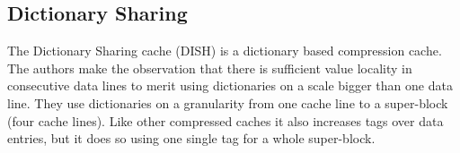 \subsection{Dictionary Sharing}
The Dictionary Sharing cache (DISH) is a dictionary based compression cache. The authors make the observation that there is sufficient value locality in consecutive data lines to merit using dictionaries on a scale bigger than one data line. They use dictionaries on a granularity from one cache line to a super-block (four cache lines). Like other compressed caches it also increases tags over data entries, but it does so using one single tag for a whole super-block.

